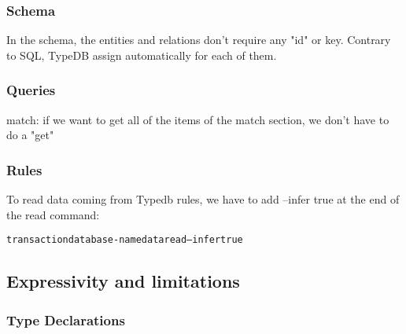 \documentclass{article}
\begin{document}
\subsubsection{Schema}
In the schema, the entities and relations don't require any "id" or key. Contrary to SQL, TypeDB assign automatically for each of them.

\subsubsection{Queries}
match: if we want to get all of the items of the match section, we don't have to do a "get"

\subsubsection{Rules}

To read data coming from Typedb rules, we have to add --infer true at the end of the read command: 
\begin{alltt}
transaction database-name data read --infer true
\end{alltt}


\subsection{Expressivity and limitations}

\subsubsection{Type Declarations}
\end{document}
